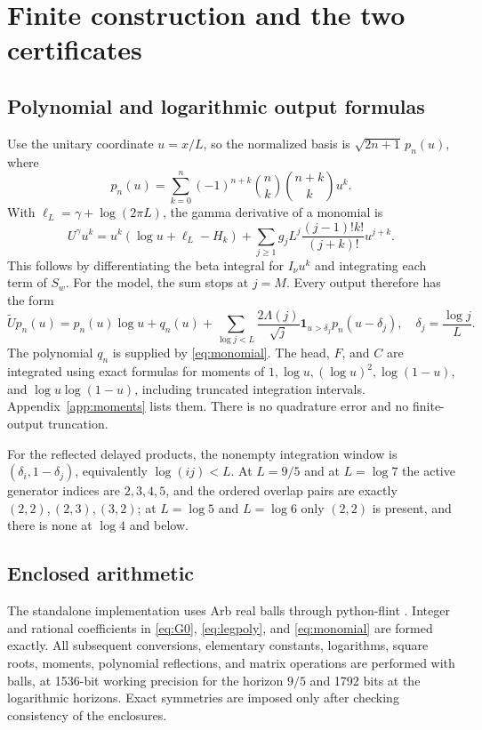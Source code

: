 \documentclass[11pt]{article}
\numberwithin{equation}{section}
\theoremstyle{definition}
\theoremstyle{remark}
\begin{document}
\section{Finite construction and the two certificates}\label{sec:computation}

\subsection{Polynomial and logarithmic output formulas}

Use the unitary coordinate $u=x/L$, so the normalized basis is
$\sqrt{2n+1}\,p_n(u)$, where
\begin{equation}\label{eq:legpoly}
 p_n(u)=\sum_{k=0}^n(-1)^{n+k}\binom nk\binom{n+k}k u^k.
\end{equation}
With $\ell_L=\gamma+\log(2\pi L)$, the gamma derivative of a monomial is
\begin{equation}\label{eq:monomial}
 U^\gamma u^k=u^k(\log u+\ell_L-H_k)
 +\sum_{j\ge1}g_jL^j\frac{(j-1)!k!}{(j+k)!}u^{j+k}.
\end{equation}
This follows by differentiating the beta integral for $I_\nu u^k$ and
integrating each term of $S_w$. For the model, the sum stops at $j=M$.
Every output therefore has the form
\begin{equation}\label{eq:output}
 \widetilde Up_n(u)=p_n(u)\log u+q_n(u)
 +\sum_{\log j<L}\frac{2\Lambda(j)}{\sqrt j}
   \mathbf1_{u>\delta_j}p_n(u-\delta_j),
 \quad \delta_j=\frac{\log j}{L}.
\end{equation}
The polynomial $q_n$ is supplied by \eqref{eq:monomial}.
The head, $F$, and $C$ are integrated using exact formulas for moments of
$1,\log u,(\log u)^2,\log(1-u)$, and $\log u\log(1-u)$, including
truncated integration intervals. Appendix~\ref{app:moments} lists them.
There is no quadrature error and no finite-output truncation.

For the reflected delayed products, the nonempty integration window is
$(\delta_i,1-\delta_j)$, equivalently $\log(ij)<L$.
At $L=9/5$ and at $L=\log7$ the active generator indices are $2,3,4,5$, and
the ordered overlap pairs are exactly $(2,2),(2,3),(3,2)$; at $L=\log5$ and
$L=\log6$ only $(2,2)$ is present, and there is none at $\log4$ and below.

\subsection{Enclosed arithmetic}

The standalone implementation uses Arb real balls \cite{Johansson2017}
through python-flint \cite{PythonFlint}. Integer and rational coefficients
in \eqref{eq:G0}, \eqref{eq:legpoly}, and \eqref{eq:monomial} are formed
exactly. All subsequent conversions, elementary constants, logarithms,
square roots, moments, polynomial reflections, and matrix operations are
performed with balls, at 1536-bit working precision for the horizon $9/5$
and 1792 bits at the logarithmic horizons. Exact symmetries are imposed only
after checking consistency of the enclosures.
\end{document}
